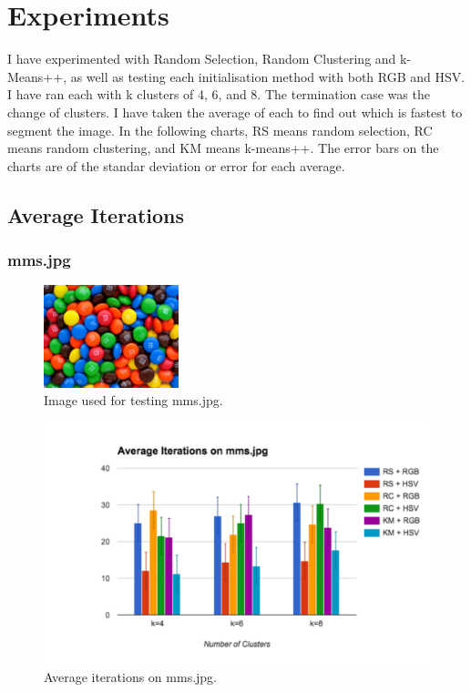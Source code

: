 \documentclass{article}
\begin{document}

\section{Experiments}

I have experimented with Random Selection, Random Clustering and k-Means++, as
well as testing each initialisation method with both RGB and HSV. I have ran
each with k clusters of 4, 6, and 8. The termination case was the change of
clusters. I have taken the average of each to find out which is fastest to
segment the image. In the following charts, RS means random selection, RC means
random clustering, and KM means k-means++. The error bars on the charts are of
the standar deviation or error for each average.

\subsection{Average Iterations}

\subsubsection{mms.jpg}

\begin{figure}[!ht]
\begin{center}
\includegraphics[width=0.35\textwidth]{images/mms}
\caption{Image used for testing mms.jpg.}
\label{fig:mmsTest}
\end{center}
\end{figure}

\begin{figure}[!ht]
\begin{center}
\includegraphics[width=1\textwidth]{images/mmsChart}
\caption{Average iterations on mms.jpg.}
\label{fig:mmsChart}
\end{center}
\end{figure}
\end{document}
